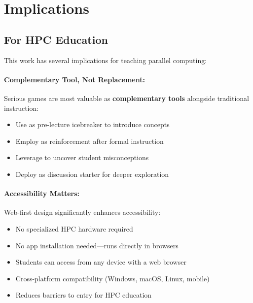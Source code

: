 \section{Implications}
\label{sec:implications}

\subsection{For HPC Education}
\label{subsec:implications-hpc-education}

This work has several implications for teaching parallel computing:

\paragraph*{Complementary Tool, Not Replacement:}

Serious games are most valuable as \textbf{complementary tools} alongside traditional instruction:
\begin{itemize}
    \item Use as pre-lecture icebreaker to introduce concepts
    \item Employ as reinforcement after formal instruction
    \item Leverage to uncover student misconceptions
    \item Deploy as discussion starter for deeper exploration
\end{itemize}

\paragraph*{Accessibility Matters:}

Web-first design significantly enhances accessibility:
\begin{itemize}
    \item No specialized HPC hardware required
    \item No app installation needed—runs directly in browsers
    \item Students can access from any device with a web browser
    \item Cross-platform compatibility (Windows, macOS, Linux, mobile)
    \item Reduces barriers to entry for HPC education
\end{itemize}

